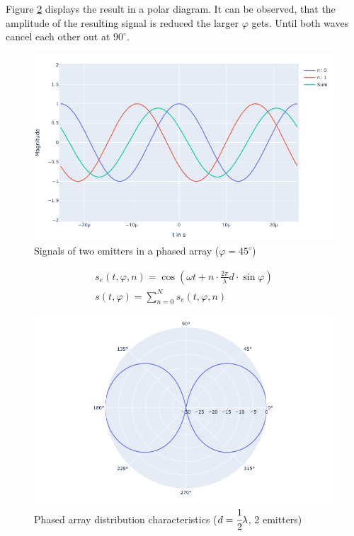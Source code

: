 Figure \ref{fig:theory:beam:n2_d.5} displays the result in a polar diagram.\cite{curtis_technology_uk_ltd_time_1998}\p
%
It can be observed, that the amplitude of the resulting signal is reduced the larger \(\varphi\) gets. Until both waves cancel each other out at \(90^\circ\).
%
\begin{figure}
  \centering
  \includegraphics[height=\mediumheight]{src/assets/pictures/theory/beam_time_n2_45deg.png}
  \caption{Signals of two emitters in a phased array ($\varphi=45^\circ$)}
  \label{fig:theory:beam:time}
\end{figure}
%
\begin{align}
  s_e(t, \varphi, n) = \cos (\omega t + n \cdot \frac{2\pi}{\lambda} d \cdot \sin \varphi )\label{eq:theory:beam:sig}\\[1em]
  s(t, \varphi) = \sum_{n = 0}^{N} s_e(t, \varphi, n)
\end{align}
%
\begin{figure}
  \centering
  \includegraphics[height=\mediumheight]{src/assets/pictures/theory/beam_n2_d0.5.png}
  \caption{Phased array distribution characteristics ($d = \cfrac{1}{2}\lambda$, 2 emitters)}\label{fig:theory:beam:n2_d.5}
\end{figure}
\clearpage
